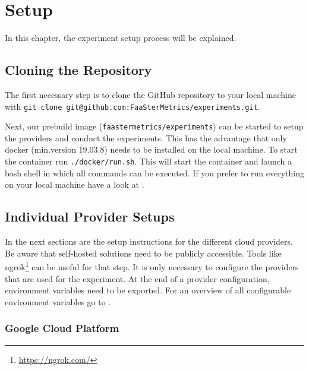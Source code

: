 \documentclass[../main.tex]{subfiles}
\begin{document}
\section{Setup}\label{sec:setup}
In this chapter, the experiment setup process will be explained.

\subsection{Cloning the Repository}\label{sec:clonesetup}

The first necessary step is to clone the GitHub repository to your local machine with 
\texttt{git clone git@github.com:FaaSterMetrics/experiments.git}. 

Next, our prebuild image (\texttt{faastermetrics/experiments}) can be started to setup the providers and conduct the experiments. 
This has the advantage that only docker (min.\@ version 19.03.8) needs to be installed on the local machine. 
To start the container run \texttt{./docker/run.sh}. 
This will start the container and launch a bash shell in which all commands can be executed.
If you prefer to run everything on your local machine have a look at .

\subsection{Individual Provider Setups}\label{sec:providersetup}

In the next sections are the setup instructions for the different cloud providers. 
Be aware that self-hosted solutions need to be publicly accessible. 
Tools like ngrok\footnote{\url{https://ngrok.com/}} can be useful for that step.
It is only necessary to configure the providers that are used for the experiment.
At the end of a provider configuration, environment variables need to be exported.
For an overview of all configurable environment variables go to .


\subsubsection{Google Cloud Platform}\label{sec:providersetupgcp}
\end{document}
